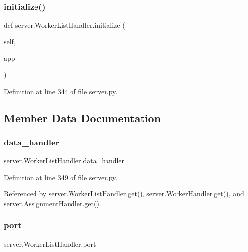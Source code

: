 \subsubsection{\texorpdfstring{initialize()}{initialize()}}
{\footnotesize\ttfamily def server.\+Worker\+List\+Handler.\+initialize (\begin{DoxyParamCaption}\item[{}]{self,  }\item[{}]{app }\end{DoxyParamCaption})}



Definition at line 344 of file server.\+py.



\subsection{Member Data Documentation}
\mbox{\label{classserver_1_1WorkerListHandler_ae749c1c421deeb18425c78e9cad74138}} 
\subsubsection{\texorpdfstring{data\+\_\+handler}{data\_handler}}
{\footnotesize\ttfamily server.\+Worker\+List\+Handler.\+data\+\_\+handler}



Definition at line 349 of file server.\+py.



Referenced by server.\+Worker\+List\+Handler.\+get(), server.\+Worker\+Handler.\+get(), and server.\+Assignment\+Handler.\+get().

\mbox{\label{classserver_1_1WorkerListHandler_af6ff3649c325b59e2c3446fdca751726}} 
\subsubsection{\texorpdfstring{port}{port}}
{\footnotesize\ttfamily server.\+Worker\+List\+Handler.\+port}



